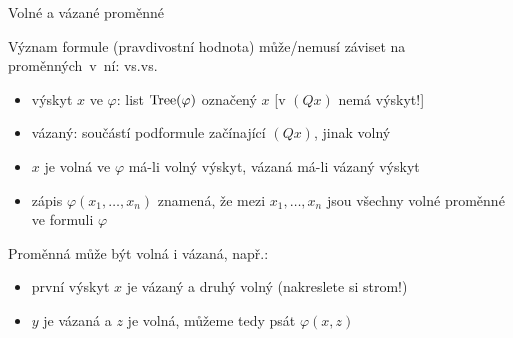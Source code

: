 \documentclass{beamer}
\begin{document}
\begin{frame}{Volné a vázané proměnné}

    Význam formule (\alert{pravdivostní hodnota}) může/nemusí záviset na proměnných~v~ní: \pause {}vs.vs.

    \pause 
    \begin{itemize}
        \item \alert{výskyt $x$ ve $\varphi$:} list $\operatorname{Tree}(\varphi)$ označený $x$ [v $(Qx)$ nemá výskyt!] \pause 
        \item \alert{vázaný}: součástí podformule začínající $(Qx)$, jinak \alert{volný} \pause 
        \item $x$ je \alert{volná} ve $\varphi$ má-li volný výskyt, \alert{vázaná} má-li vázaný výskyt \pause 
        \item zápis \alert{$\varphi(x_1,\dots,x_n)$} znamená, že mezi $x_1,\dots,x_n$ jsou všechny volné proměnné ve formuli $\varphi$ \pause 
    \end{itemize}

    Proměnná může být \alert{volná i vázaná}, např.:
     \pause 

    \begin{itemize}
        \item první výskyt $x$ je vázaný a druhý volný (nakreslete si strom!)  \pause 
        \item $y$ je vázaná a $z$ je volná, můžeme tedy psát $\varphi(x,z)$
    \end{itemize}

\end{frame}
\end{document}

